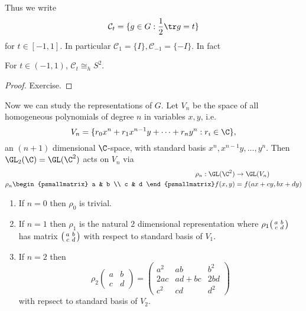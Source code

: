 \documentclass[a4paper]{article}
\newcommand{\ccl}{{\mathcal C}} %
\theoremstyle{definition}
\begin{document}
Thus we write
\[
  \ccl_t = \{g \in G: \frac{1}{2} \tr g = t\}
\]
for \(t \in [-1, 1]\). In particular \(\ccl_1 = \{I\}, \ccl_{-1} = \{-I\}\). In fact

\begin{proposition}
  For \(t \in (-1, 1)\), \(\ccl_t \cong_h S^2\).
\end{proposition}

\begin{proof}
  Exercise.
\end{proof}

Now we can study the representations of \(G\). Let \(V_n\) be the space of all homogeneous polynomials of degree \(n\) in variables \(x, y\), i.e.
\[
  V_n = \{r_0x^n + r_1x^{n - 1}y + \dots + r_ny^n: r_i \in \C\},
\]
an \((n + 1)\) dimensional \(\C\)-space, with standard basis \(x^n, x^{n - 1}y, \dots, y^n\). Then \(\GL_2(\C) = \GL(\C^2)\) acts on \(V_n\) via
\begin{align*}
  \rho_n: \GL(\C^2) &\to \GL(V_n) \\
  \rho_n
  \begin{psmallmatrix}
    a & b \\
    c & d
  \end{psmallmatrix}
        f(x, y) &= f(ax + cy, bx + dy)
\end{align*}

\begin{ex}\leavevmode
  \begin{enumerate}
  \item If \(n = 0\) then \(\rho_0\) is trivial.
  \item If \(n = 1\) then \(\rho_1\) is the natural \(2\) dimensional representation where \(\rho_1
    \begin{psmallmatrix}
      a & b \\
      c & d
    \end{psmallmatrix}
    \) has matrix \(
    \begin{psmallmatrix}
      a & b \\
      c & d
    \end{psmallmatrix}
    \) with respect to standard basis of \(V_1\).
  \item If \(n = 2\) then
    \[
      \rho_2
      \begin{pmatrix}
        a & b \\
        c & d
      \end{pmatrix}
      =
      \begin{pmatrix}
        a^2 & ab & b^2 \\
        2ac & ad + bc & 2bd \\
        c^2 & cd & d^2
      \end{pmatrix}
    \]
    with repsect to standard basis of \(V_2\).
  \end{enumerate}
\end{ex}
\end{document}
